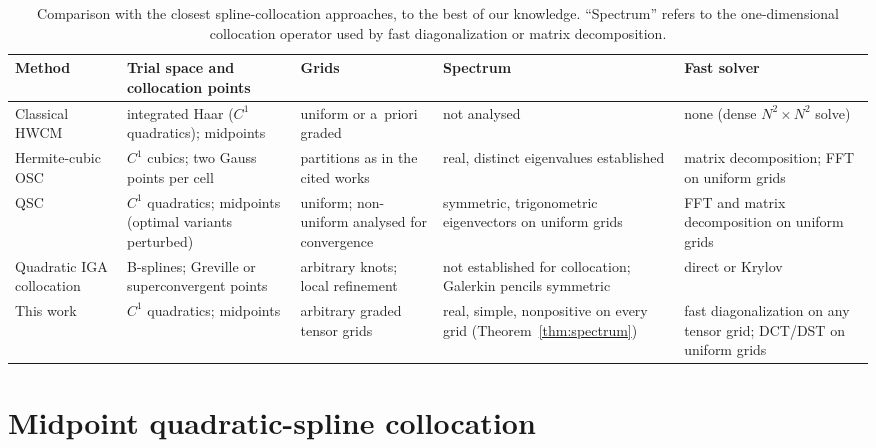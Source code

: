 
\begin{table}[t]\centering\footnotesize
\caption{Comparison with the closest spline-collocation approaches, to the best of our knowledge.
``Spectrum'' refers to the one-dimensional collocation operator used by fast diagonalization or matrix
decomposition.}\label{tab:closest}
\begin{tabular}{p{}p{}p{}p{}p{}}
\toprule
Method & Trial space and collocation points & Grids & Spectrum & Fast solver\\
\midrule
Classical HWCM~\cite{lepik2011solving,oruc2019nonuniform} & integrated Haar ($C^1$ quadratics); midpoints & uniform or a~priori graded & not analysed & none (dense $N^2\times N^2$ solve)\\
Hermite-cubic OSC~\cite{dyksen1987tensor,sun1999spectral,bialecki1995matrix} & $C^1$ cubics; two Gauss points per cell & partitions as in the cited works & real, distinct eigenvalues established & matrix decomposition; FFT on uniform grids\\
QSC~\cite{houstis1988quadratic,christara2002fast,christara2006optimal} & $C^1$ quadratics; midpoints (optimal variants perturbed) & uniform; non-uniform analysed for convergence & symmetric, trigonometric eigenvectors on uniform grids & FFT and matrix decomposition on uniform grids\\
Quadratic IGA collocation~\cite{auricchio2010isogeometric,schillinger2013isogeometric,delorenzis2015isogeometric} & B-splines; Greville or superconvergent points & arbitrary knots; local refinement & not established for collocation; Galerkin pencils symmetric~\cite{sangalli2016isogeometric} & direct or Krylov\\
This work & $C^1$ quadratics; midpoints & arbitrary graded tensor grids & real, simple, nonpositive on every grid (Theorem~\ref{thm:spectrum}) & fast diagonalization on any tensor grid; DCT/DST on uniform grids\\
\bottomrule
\end{tabular}
\end{table}

\section{Midpoint quadratic-spline collocation}\label{sec:method}
